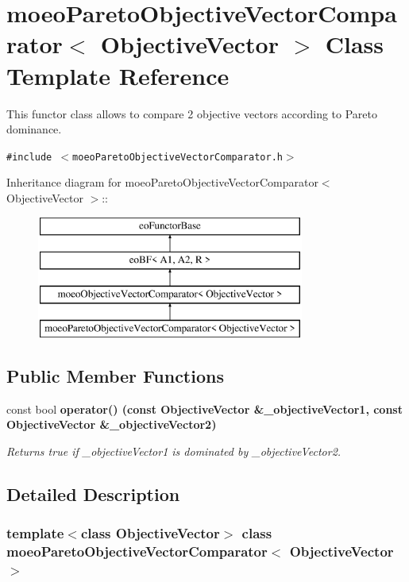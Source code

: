 \section{moeo\-Pareto\-Objective\-Vector\-Comparator$<$ Objective\-Vector $>$ Class Template Reference}
\label{classmoeoParetoObjectiveVectorComparator}
This functor class allows to compare 2 objective vectors according to Pareto dominance.  


{\tt \#include $<$moeo\-Pareto\-Objective\-Vector\-Comparator.h$>$}

Inheritance diagram for moeo\-Pareto\-Objective\-Vector\-Comparator$<$ Objective\-Vector $>$::\begin{figure}[H]
\begin{center}
\leavevmode
\includegraphics[height=4cm]{classmoeoParetoObjectiveVectorComparator}
\end{center}
\end{figure}
\subsection*{Public Member Functions}
\begin{CompactItemize}
\item 
const bool \bf{operator()} (const \bf{Objective\-Vector} \&\_\-objective\-Vector1, const \bf{Objective\-Vector} \&\_\-objective\-Vector2)
\begin{CompactList}\small\item\em Returns true if \_\-objective\-Vector1 is dominated by \_\-objective\-Vector2. \item\end{CompactList}\end{CompactItemize}


\subsection{Detailed Description}
\subsubsection*{template$<$class Objective\-Vector$>$ class moeo\-Pareto\-Objective\-Vector\-Comparator$<$ Objective\-Vector $>$}

